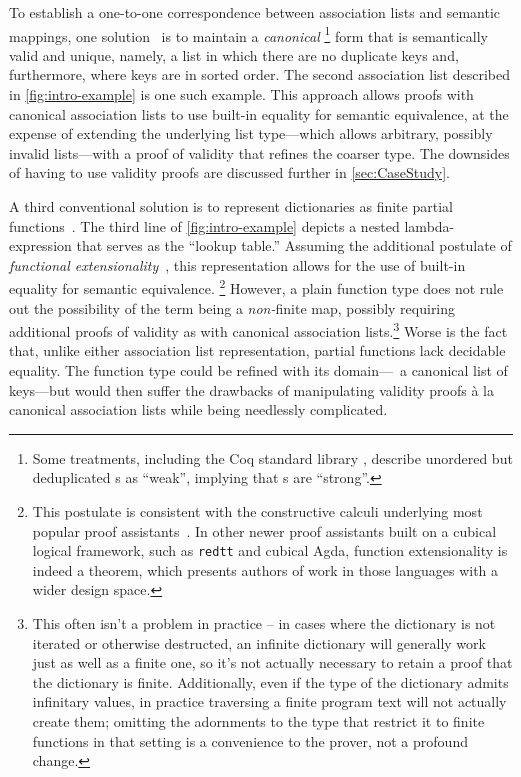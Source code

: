 

To establish a one-to-one correspondence between association lists and semantic mappings, one solution~\citep{FMapList} is to maintain a \emph{canonical}
%
\footnote{
  Some treatments, including the Coq standard library \citep{FMapInterface}, describe unordered but deduplicated \sal{}s as ``weak'', implying that \cal{}s are ``strong''.
}
form that is semantically valid and unique, namely, a list in which there are no duplicate keys and, furthermore, where keys are in sorted order.
%
The second association list described in \autoref{fig:intro-example} is one such example.
%
This approach allows proofs with canonical association lists to use built-in equality for semantic equivalence, at the expense of extending the underlying list type---which allows arbitrary, possibly invalid lists---with a proof of validity that refines the coarser type. The downsides of having to use validity proofs are discussed further in \autoref{sec:CaseStudy}.

A third conventional solution is to represent dictionaries as finite partial functions~\cite[Maps]{Pierce:SF1}.
%
The third line of \autoref{fig:intro-example} depicts a nested lambda-expression that serves as the ``lookup table.''
%
Assuming the additional postulate of \emph{functional
extensionality}~\cite[Logic]{Pierce:SF1}, this representation allows for
the use of built-in equality for semantic equivalence.
\footnote{\hspace{0.01in}%
%
This postulate is consistent with the constructive calculi underlying most
popular proof assistants~\cite[Logic]{Pierce:SF1}. In other newer proof
assistants built on a cubical logical framework, such as \texttt{redtt} and
cubical Agda, function extensionality is indeed a theorem, which presents
authors of work in those languages with a wider design space.
%
}
%
However, a plain function type does not rule out the possibility of the term being a \emph{non-}finite map, possibly requiring additional proofs of validity as with canonical association lists.\footnote{\hspace{0.01in}%
%
This often isn't a problem in practice -- in cases where the dictionary is not iterated or otherwise destructed, an infinite dictionary will generally work just as well as a finite one,
%
so it's not actually necessary to retain a proof that the dictionary is
finite. Additionally, even if the type of the dictionary admits infinitary
values, in practice traversing a finite program text will not actually
create them; omitting the adornments to the type that restrict it to finite
functions in that setting is a convenience to the prover, not a profound
change.
%
}
%
Worse is the fact that, unlike either association list representation, partial functions lack decidable equality.
%
The function type could be refined with its domain---\ie{}~a canonical list of keys---but would then suffer the drawbacks of manipulating validity proofs \`{a} la canonical association lists while being needlessly complicated.

